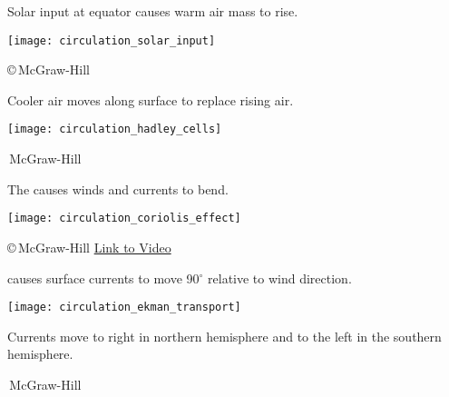 \documentclass[t]{beamer}
\begin{document}
\begin{frame}[t]{Solar input at equator causes warm air mass to rise.}
	\begin{center}
		\texttt{[image: circulation\_solar\_input]}
	\end{center}

	\vfilll

	\hfill \tiny \copyright\,McGraw-Hill
\end{frame}
%
\begin{frame}[t]{Cooler air moves along surface to replace rising air.}

	\begin{center}
		\texttt{[image: circulation\_hadley\_cells]}
	\end{center}

	\vfilll

	\hfill \tiny \textcopyright\,McGraw-Hill
\end{frame}
%
\begin{frame}[t]{The  causes winds and currents to bend.}

	\begin{center}
		\texttt{[image: circulation\_coriolis\_effect]}
	\end{center}

	\vfilll

	\tiny \copyright\,McGraw-Hill \hfill \href{https://youtu.be/aeY9tY9vKgs}{Link to Video}%
\end{frame}
%
\begin{frame}[t]{ causes surface currents to move 90$^\circ$ relative to wind direction.}
	\begin{multicols}{2}

		\texttt{[image: circulation\_ekman\_transport]}

	\columnbreak

		\hangpara\parbox[t]{0.45\textwidth}{Currents move to right in northern hemisphere and to the left in the southern hemisphere.}
	
	
	
	\end{multicols}

	\vfilll

	\hfill \tiny \textcopyright\,McGraw-Hill

\end{frame}
\end{document}
